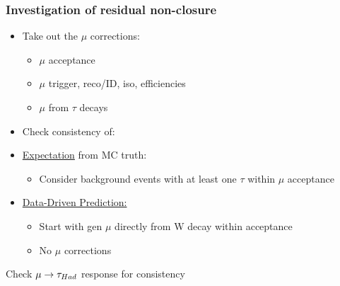 \documentclass{beamer}
\begin{document}
\begin{frame}
 \frametitle{Investigation of residual non-closure}
 \begin{itemize}
  \item Take out the $\mu$ corrections:
  \begin{itemize}
   \item $\mu$ acceptance 
   \item $\mu$ trigger, reco/ID, iso, efficiencies
   \item $\mu$ from $\tau$ decays
  \end{itemize}
  \item Check consistency of:
  \item \uline{Expectation} from MC truth:
  \begin{itemize}
   \item Consider \hadtau background events with at least one $\tau$ within $\mu$ acceptance
  \end{itemize}
  \item \uline{Data-Driven Prediction:}
  \begin{itemize}
   \item Start with gen $\mu$ directly from W decay within acceptance
   \item No $\mu$ corrections
  \end{itemize}
 \end{itemize}
 \begin{block}{}
 \centering
 \Large Check $\mu\rightarrow\tau_{Had}$ response for consistency
 \end{block}
\end{frame}
\end{document}
